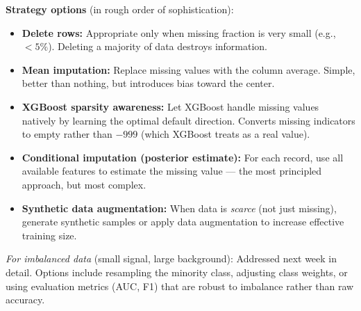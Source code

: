 \documentclass[11pt]{article}
\begin{document}
\textbf{Strategy options} (in rough order of sophistication):

\begin{itemize}
    \item \textbf{Delete rows:} Appropriate only when missing fraction is very
      small (e.g., $<5\%$). Deleting a majority of data destroys information.
    \item \textbf{Mean imputation:} Replace missing values with the column average.
      Simple, better than nothing, but introduces bias toward the center.
    \item \textbf{XGBoost sparsity awareness:} Let XGBoost handle missing values
      natively by learning the optimal default direction. Converts missing
      indicators to empty rather than $-999$ (which XGBoost treats as a real
      value).
    \item \textbf{Conditional imputation (posterior estimate):} For each record,
      use all available features to estimate the missing value --- the most
      principled approach, but most complex.
    \item \textbf{Synthetic data augmentation:} When data is \emph{scarce} (not
      just missing), generate synthetic samples or apply data augmentation to
      increase effective training size.
\end{itemize}

\textit{For imbalanced data} (small signal, large background): Addressed next
week in detail. Options include resampling the minority class, adjusting class
weights, or using evaluation metrics (AUC, F1) that are robust to imbalance
rather than raw accuracy.
\end{document}
